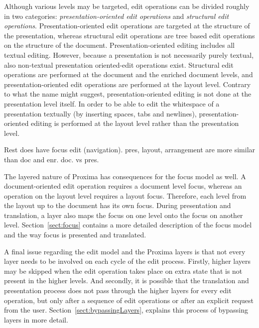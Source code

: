 \bc
Although various levels may be targeted, edit operations can be divided roughly in two categories: {\em presentation-oriented edit operations} and {\em structural edit operations}. Presentation-oriented edit operations are targeted at the structure of the presentation, whereas structural edit operations are tree based edit operations on the structure of the document.  Presentation-oriented editing includes all textual editing. However, because a presentation is not necessarily purely textual, also non-textual presentation oriented-edit operations exist. Structural edit operations are performed at the document and the enriched document levels, and presentation-oriented edit operations are performed at the layout level. Contrary to what the name might suggest, presentation-oriented editing is not done at the presentation level itself. In order to be able to edit the whitespace of a presentation textually (by inserting spaces, tabs and newlines), presentation-oriented editing is performed at the layout level rather than the presentation level. 
\ec

\bc
Rest does have focus edit (navigation). pres, layout, arrangement are more similar than doc  and enr.
doc. vs pres.
\ec

The layered nature of Proxima has consequences for the focus model as well. A document-oriented edit operation requires a document level focus, whereas an operation on the layout level requires a layout focus. Therefore, each level from the layout up to the document has its own focus. During presentation and translation, a layer also maps the focus on one level onto the focus on another level. Section~\ref{sect:focus} contains a more detailed description of the focus model and the way focus is presented and translated.

A final issue regarding the edit model and the Proxima layers is that not every layer needs to be involved on each cycle of the edit process. Firstly, higher layers may be skipped when the edit operation takes place on extra state that is not present in the higher levels. And secondly, it is possible that the translation and presentation process does not pass through the higher layers for every edit operation, but only after a sequence of edit operations or after an explicit request from the user. Section~\ref{sect:bypassingLayers}, explains this process of bypassing layers in more detail.

